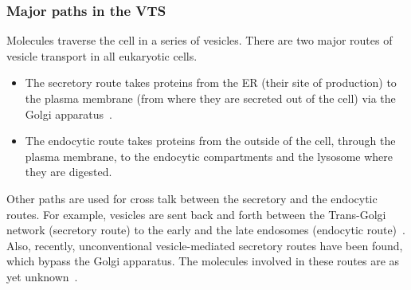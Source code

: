 \subsubsection{Major paths in the VTS}
Molecules traverse the cell in a series of vesicles. There are two major routes of vesicle transport in all eukaryotic cells.
%
\begin{itemize}
	\item The secretory route takes proteins from the ER (their site of production) to the plasma membrane (from where they are secreted out of the cell) via the Golgi apparatus~\cite{alberts2002molecular}.
	\item The endocytic route takes proteins from the outside of the cell, through the plasma membrane, to the endocytic compartments and the lysosome where they are digested. 
\end{itemize}
Other paths are used for cross talk between the secretory and the endocytic routes. For example, vesicles are sent back and forth between the Trans-Golgi network (secretory route) to the early and the late endosomes (endocytic route)~\cite{progida2016bidirectional}. Also, recently, unconventional vesicle-mediated secretory routes have been found, which bypass the Golgi apparatus. The molecules involved in these routes are as yet unknown~\cite{nickel2018unconventional}. 
%

